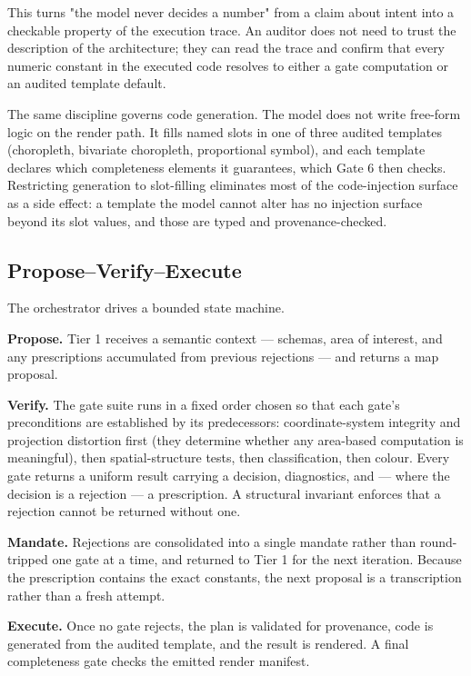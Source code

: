 This turns "the model never decides a number" from a claim about intent into a checkable property of the execution trace. An auditor does not need to trust the description of the architecture; they can read the trace and confirm that every numeric constant in the executed code resolves to either a gate computation or an audited template default.

The same discipline governs code generation. The model does not write free-form logic on the render path. It fills named slots in one of three audited templates (choropleth, bivariate choropleth, proportional symbol), and each template declares which completeness elements it guarantees, which Gate 6 then checks. Restricting generation to slot-filling eliminates most of the code-injection surface as a side effect: a template the model cannot alter has no injection surface beyond its slot values, and those are typed and provenance-checked.

\subsection{Propose--Verify--Execute}
The orchestrator drives a bounded state machine.

\textbf{Propose.} Tier 1 receives a semantic context --- schemas, area of interest, and any prescriptions accumulated from previous rejections --- and returns a map proposal.

\textbf{Verify.} The gate suite runs in a fixed order chosen so that each gate's preconditions are established by its predecessors: coordinate-system integrity and projection distortion first (they determine whether any area-based computation is meaningful), then spatial-structure tests, then classification, then colour. Every gate returns a uniform result carrying a decision, diagnostics, and --- where the decision is a rejection --- a prescription. A structural invariant enforces that a rejection cannot be returned without one.

\textbf{Mandate.} Rejections are consolidated into a single mandate rather than round-tripped one gate at a time, and returned to Tier 1 for the next iteration. Because the prescription contains the exact constants, the next proposal is a transcription rather than a fresh attempt.

\textbf{Execute.} Once no gate rejects, the plan is validated for provenance, code is generated from the audited template, and the result is rendered. A final completeness gate checks the emitted render manifest.

